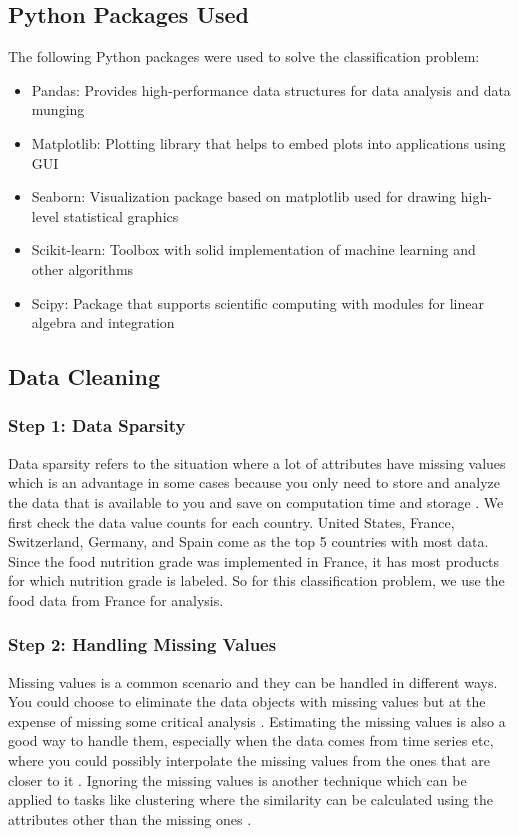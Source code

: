 \documentclass[sigconf]{acmart}
\begin{document}
\subsection{Python Packages Used}
The following Python packages were used to solve the classification problem: \\
\begin{itemize}
    \item Pandas: Provides high-performance data structures for data analysis and data munging
    \item Matplotlib: Plotting library that helps to embed plots into applications using GUI 
    \item Seaborn: Visualization package based on matplotlib used for drawing high-level statistical graphics 
    \item Scikit-learn: Toolbox with solid implementation of machine learning and other algorithms
    \item Scipy: Package that supports scientific computing with modules for linear algebra and integration
\end{itemize}

\subsection{Data Cleaning}
\subsubsection{Step 1: Data Sparsity} 
Data sparsity refers to the situation where a lot of attributes have missing values which is an advantage in some cases because you only need to store and analyze the data that is available to you and save on computation time and storage \cite{book-tan}. We first check the data value counts for each country. United States, France, Switzerland, Germany, and Spain come as the top 5 countries with most data. Since the food nutrition grade was implemented in France, it has most products for which nutrition grade is labeled. So for this classification problem, we use the food data from France for analysis.

\subsubsection{Step 2: Handling Missing Values}
Missing values is a common scenario and they can be handled in different ways. You could choose to eliminate the data objects with missing values but at the expense of missing some critical analysis \cite{book-tan}. Estimating the missing values is also a good way to handle them, especially when the data comes from time series etc, where you could possibly interpolate the missing values from the ones that are closer to it \cite{book-tan}. Ignoring the missing values is another technique which can be applied to tasks like clustering where the similarity can be calculated using the attributes other than the missing ones \cite{book-tan}. \\
\end{document}
